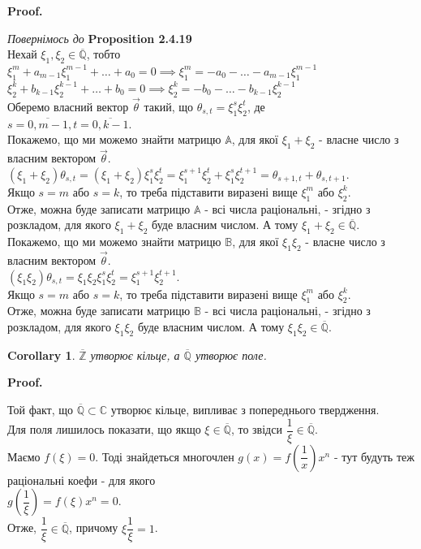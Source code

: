 \documentclass[a4paper, 10pt]{article}
\makeatletter
\theoremstyle{theoremdd}
\theoremstyle{theoremdd}
\theoremstyle{theoremdd}
\theoremstyle{theoremdd}
\theoremstyle{theoremdd}
\theoremstyle{theoremdd}
\theoremstyle{theoremdd}
\theoremstyle{theoremdd}
\newtheorem{corollary}[theorem]{Corollary}
\renewenvironment{proof}[1][Proof.\\]{\par
\pushQED{\hfill \qed}%
\normalfont \topsep6\p@\@plus6\p@\relax
\trivlist
\item\relax
{\bfseries
#1\@addpunct{.}}\hspace\labelsep\ignorespaces
}{%
\popQED\endtrivlist\@endpefalse
}
\makeatother
\begin{document}
\begin{proof}
\textit{Повернімось до} \textbf{Proposition 2.4.19}\\
Нехай $\xi_1,\xi_2 \in \overline{\mathbb{Q}}$, тобто\\
$\xi_1^m + a_{m-1}\xi_1^{m-1} + \dots + a_0 = 0 \implies \xi_1^m = -a_0 - \dots - a_{m-1}\xi_1^{m-1}$\\
$\xi_2^k + b_{k-1}\xi_2^{k-1} + \dots + b_0 = 0 \implies \xi_2^k = -b_0 - \dots - b_{k-1} \xi_2^{k-1}$\\
Оберемо власний вектор $\vec{\theta}$ такий, що $\theta_{s,t} = \xi_1^s \xi_2^t$, де \\ $s = \overline{0,m-1}, t = \overline{0,k-1}$.\\
Покажемо, що ми можемо знайти матрицю $\mathbb{A}$, для якої $\xi_1+\xi_2$ - власне число з власним вектором $\vec{\theta}$.\\
$(\xi_1+\xi_2) \theta_{s,t} = (\xi_1+\xi_2) \xi_1^s \xi_2^t = \xi_1^{s+1} \xi_2^t + \xi_1^s \xi_2^{t+1} = \theta_{s+1,t} + \theta_{s,t+1}$.\\
Якщо $s = m$ або $s = k$, то треба підставити виразені вище $\xi_1^m$ або $\xi_2^k$.\\
Отже, можна буде записати матрицю $\mathbb{A}$ - всі числа раціональні, - згідно з розкладом, для якого $\xi_1+\xi_2$ буде власним числом. А тому $\xi_1+\xi_2 \in \overline{\mathbb{Q}}$.
\bigskip \\
Покажемо, що ми можемо знайти матрицю $\mathbb{B}$, для якої $\xi_1\xi_2$ - власне число з власним вектором $\vec{\theta}$.\\
$(\xi_1\xi_2) \theta_{s,t} = \xi_1\xi_2 \xi_1^s \xi_2^t = \xi_1^{s+1}\xi_2^{t+1}$.\\
Якщо $s = m$ або $s = k$, то треба підставити виразені вище $\xi_1^m$ або $\xi_2^k$.\\
Отже, можна буде записати матрицю $\mathbb{B}$ - всі числа раціональні, - згідно з розкладом, для якого $\xi_1\xi_2$ буде власним числом. А тому $\xi_1 \xi_2 \in \overline{\mathbb{Q}}$.
\end{proof}

\begin{corollary}
$\overline{\mathbb{Z}}$ утворює кільце, а $\overline{\mathbb{Q}}$ утворює поле.
\end{corollary}

\begin{proof}
Той факт, що $\overline{\mathbb{Q}} \subset \mathbb{C}$ утворює кільце, випливає з попереднього твердження.\\
Для поля лишилось показати, що якщо $\xi \in \overline{\mathbb{Q}}$, то звідси $\dfrac{1}{\xi} \in \overline{\mathbb{Q}}$.\\
Маємо $f(\xi) = 0$. Тоді знайдеться многочлен $g(x) = f\left( \dfrac{1}{x}\right) x^n$ - тут будуть теж раціональні коефи - для якого\\
$g\left( \dfrac{1}{\xi} \right) = f(\xi) x^n = 0$.\\
Отже, $\dfrac{1}{\xi} \in \overline{\mathbb{Q}}$, причому $\xi \dfrac{1}{\xi} = 1$.
\end{proof}
\end{document}
